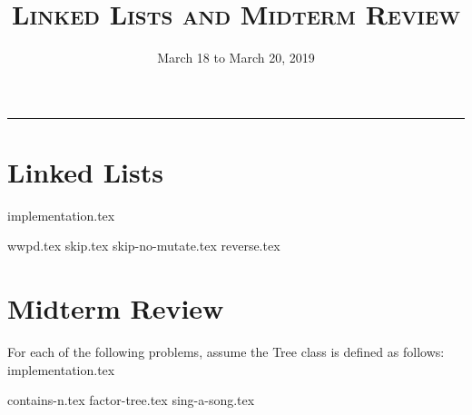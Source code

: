 \documentclass{exam}
\title{\textsc{Linked Lists and Midterm Review}}
\date{March 18 to March 20, 2019}
\begin{document}
\maketitle
\rule{\textwidth}{0.15em}
\fontsize{12}{15}\selectfont

\section{Linked Lists}
{implementation.tex}
\begin{questions}
\newpage
{wwpd.tex}
\newpage
{skip.tex}
{skip-no-mutate.tex}
\newpage
{reverse.tex}
\end{questions}

\section{Midterm Review}
For each of the following problems, assume the Tree class is defined as follows:
\vspace{2\baselineskip}
{implementation.tex}
\vspace{\baselineskip}
\begin{questions}
{contains-n.tex}
\newpage
{factor-tree.tex}
\newpage
{sing-a-song.tex}

\end{questions}
\end{document}
